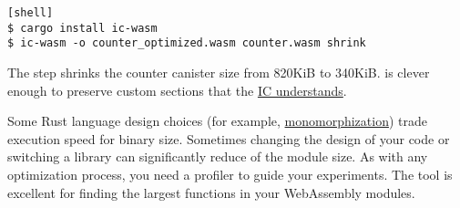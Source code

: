 \documentclass{article}
\begin{document}
\begin{verbatim}[shell]
$ cargo install ic-wasm
$ ic-wasm -o counter_optimized.wasm counter.wasm shrink
\end{verbatim}

The  step shrinks the counter canister size from 820KiB to 340KiB.
 is clever enough to preserve custom sections that the \href{https://internetcomputer.org/docs/current/references/ic-interface-spec/#state-tree-canister-information}{IC understands}.


Some Rust language design choices (for example, \href{https://rustc-dev-guide.rust-lang.org/backend/monomorph.html}{monomorphization}) trade execution speed for binary size.
Sometimes changing the design of your code or switching a library can significantly reduce of the module size.
As with any optimization process, you need a profiler to guide your experiments.
The \href{https://rustwasm.github.io/twiggy/}{} tool is excellent for finding the largest functions in your WebAssembly modules.
\end{document}
